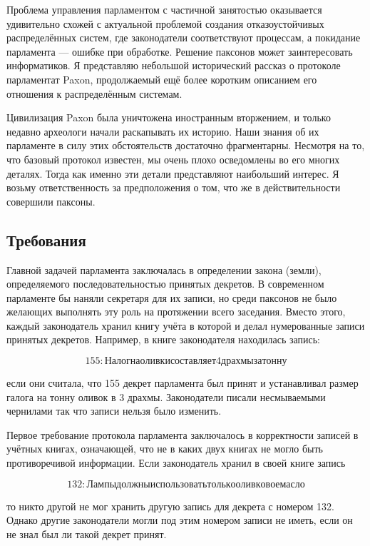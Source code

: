 Проблема управления парламентом с частичной занятостью оказывается удивительно схожей с актуальной проблемой создания отказоустойчивых распределённых систем, где законодатели соответствуют процессам, а покидание парламента --- ошибке при обработке. Решение паксонов может заинтересовать информатиков. Я представляю небольшой исторический рассказ о протоколе парламентат Paxon, продолжаемый ещё более коротким описанием его отношения к распределённым системам.

Цивилизация Paxon была уничтожена иностранным вторжением, и только недавно археологи начали раскапывать их историю. Наши знания об их парламенте в силу этих обстоятельств достаточно фрагментарны. Несмотря на то, что базовый протокол известен, мы очень плохо осведомлены во его многих деталях. Тогда как именно эти детали представляют наибольший интерес. Я возьму ответственность за предположения о том, что же в действительности совершили паксоны.

\subsection{Требования}

Главной задачей парламента заключалась в определении закона (земли), определяемого последовательностью принятых декретов. В современном парламенте бы наняли секретаря для их записи, но среди паксонов не было желающих выполнять эту роль на протяжении всего заседания. Вместо этого, каждый законодатель хранил книгу учёта в которой и делал нумерованные записи принятых декретов. Например, в книге законодателя \Lambda\iota\nu\chi\partial находилась запись:

\[
    155: Налог на оливки составляет 4 драхмы за тонну
\]

если они считала, что 155 декрет парламента был принят и устанавливал размер галога на тонну оливок в 3 драхмы. Законодатели писали несмываемыми чернилами так что записи нельзя было изменить. 

Первое требование протокола парламента заключалось в корректности записей в учётных книгах, означающей, что не в каких двух книгах не могло быть противоречивой информации. Если законодатель \Phi\iota\partial\epsilon\rho хранил в своей книге запись 

\[
    132: Лампы должны использовать только оливковое масло
\]

то никто другой не мог хранить другую запись для декрета с номером 132. Однако другие законодатели могли под этим номером записи не иметь, если он не знал был ли такой декрет принят.

